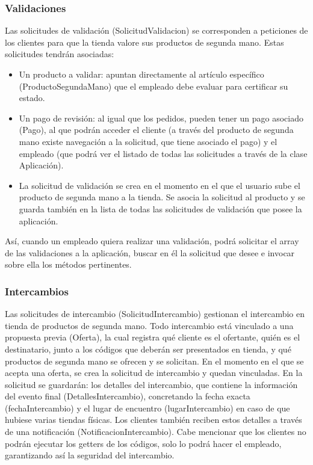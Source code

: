 \documentclass{article}
\begin{document}
\subsubsection{Validaciones}
Las solicitudes de validación (SolicitudValidacion) se corresponden a peticiones de los clientes para que la tienda valore sus productos de segunda mano. Estas solicitudes tendrán asociadas:
\begin{itemize}
  \item Un producto a validar: apuntan directamente al artículo específico (ProductoSegundaMano) que el empleado debe evaluar para certificar su estado.
  \item Un pago de revisión: al igual que los pedidos, pueden tener un pago asociado (Pago), al que podrán acceder el cliente (a través del producto de segunda mano existe navegación a la solicitud, que tiene asociado el pago) y el empleado (que podrá ver el listado de todas las solicitudes a través de la clase Aplicación).
  \item La solicitud de validación se crea en el momento en el que el usuario sube el producto de segunda mano a la tienda. Se asocia la solicitud al producto y se guarda también en la lista de todas las solicitudes de validación que posee la aplicación.
\end{itemize}
Así, cuando un empleado quiera realizar una validación, podrá solicitar el array de las validaciones a la aplicación, buscar en él la solicitud que desee e invocar sobre ella los métodos pertinentes.

\subsubsection{Intercambios}
Las solicitudes de intercambio (SolicitudIntercambio) gestionan el intercambio en tienda de productos de segunda mano.
Todo intercambio está vinculado a una propuesta previa (Oferta), la cual registra qué cliente es el ofertante, quién es el destinatario, junto a los códigos que deberán ser presentados en tienda, y qué productos de segunda mano se ofrecen y se solicitan. En el momento en el que se acepta una oferta, se crea la solicitud de intercambio y quedan vinculadas. En la solicitud se guardarán: los detalles del intercambio, que contiene la información del evento final (DetallesIntercambio), concretando la fecha exacta (fechaIntercambio) y el lugar de encuentro (lugarIntercambio) en caso de que hubiese varias tiendas físicas.
Los clientes también reciben estos detalles a través de una notificación (NotificacionIntercambio).
Cabe mencionar que los clientes no podrán ejecutar los getters de los códigos, solo lo podrá hacer el empleado, garantizando así la seguridad del intercambio.
\end{document}
